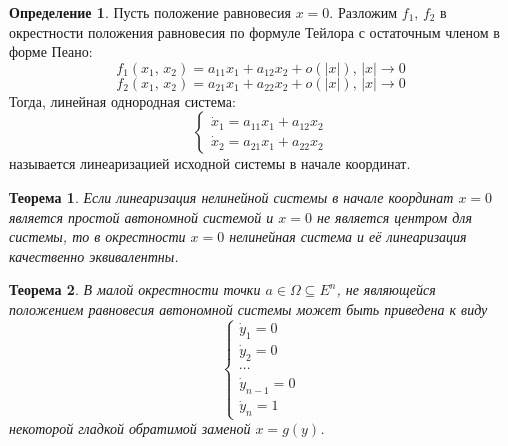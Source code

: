 \documentclass[a4paper,12pt]{article}
\theoremstyle{plain}
\newtheorem{theorem}{Теорема}[section]
\theoremstyle{definition}
\newtheorem{definition}{Определение}[section]
\theoremstyle{remark}
\begin{document}
\begin{definition}
	Пусть положение равновесия $x = 0$. Разложим $f_1,\, f_2$ в окрестности положения равновесия по формуле Тейлора с остаточным членом в форме Пеано:
	\[f_1(x_1,\,x_2) = a_{11}x_1 + a_{12}x_2 + o(|x|),\, |x| \to 0\]
	\[f_2(x_1,\,x_2) = a_{21}x_1 + a_{22}x_2 + o(|x|),\, |x| \to 0\]
	Тогда, линейная однородная система:
	\[\begin{cases}
			\dot{x}_1 = a_{11}x_1 + a_{12}x_2 \\
			\dot{x}_2 = a_{21}x_1 + a_{22}x_2
		\end{cases}\]
	называется линеаризацией исходной системы в начале координат.
\end{definition}

\begin{theorem}
	Если линеаризация нелинейной системы в начале координат $x = 0$ является простой автономной системой и $x = 0$ не является центром для системы, то в окрестности $x = 0$ нелинейная система и её линеаризация качественно эквивалентны.
\end{theorem}

\begin{theorem}
	В малой окрестности точки $a \in \Omega \subseteq E^n$, не являющейся положением равновесия автономной системы может быть приведена к виду
	\[\begin{cases}
			\dot{y}_1 = 0     \\
			\dot{y}_2 = 0     \\
			\cdots            \\
			\dot{y}_{n-1} = 0 \\
			\dot{y}_n = 1
		\end{cases}\]
	некоторой гладкой обратимой заменой $x = g(y)$.
\end{theorem}
\end{document}
